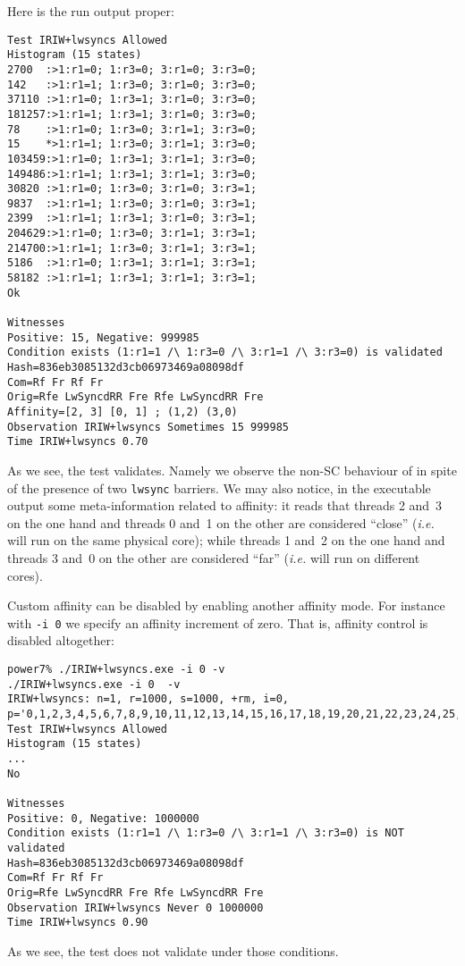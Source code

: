 Here is the run output proper:
\begin{verbatim}
Test IRIW+lwsyncs Allowed
Histogram (15 states)
2700  :>1:r1=0; 1:r3=0; 3:r1=0; 3:r3=0;
142   :>1:r1=1; 1:r3=0; 3:r1=0; 3:r3=0;
37110 :>1:r1=0; 1:r3=1; 3:r1=0; 3:r3=0;
181257:>1:r1=1; 1:r3=1; 3:r1=0; 3:r3=0;
78    :>1:r1=0; 1:r3=0; 3:r1=1; 3:r3=0;
15    *>1:r1=1; 1:r3=0; 3:r1=1; 3:r3=0;
103459:>1:r1=0; 1:r3=1; 3:r1=1; 3:r3=0;
149486:>1:r1=1; 1:r3=1; 3:r1=1; 3:r3=0;
30820 :>1:r1=0; 1:r3=0; 3:r1=0; 3:r3=1;
9837  :>1:r1=1; 1:r3=0; 3:r1=0; 3:r3=1;
2399  :>1:r1=1; 1:r3=1; 3:r1=0; 3:r3=1;
204629:>1:r1=0; 1:r3=0; 3:r1=1; 3:r3=1;
214700:>1:r1=1; 1:r3=0; 3:r1=1; 3:r3=1;
5186  :>1:r1=0; 1:r3=1; 3:r1=1; 3:r3=1;
58182 :>1:r1=1; 1:r3=1; 3:r1=1; 3:r3=1;
Ok

Witnesses
Positive: 15, Negative: 999985
Condition exists (1:r1=1 /\ 1:r3=0 /\ 3:r1=1 /\ 3:r3=0) is validated
Hash=836eb3085132d3cb06973469a08098df
Com=Rf Fr Rf Fr
Orig=Rfe LwSyncdRR Fre Rfe LwSyncdRR Fre
Affinity=[2, 3] [0, 1] ; (1,2) (3,0)
Observation IRIW+lwsyncs Sometimes 15 999985
Time IRIW+lwsyncs 0.70
\end{verbatim}
As we see, the test validates. Namely we observe the non-SC behaviour of
 in spite of the presence of two \texttt{lwsync} barriers.
We may also notice, in the executable output some meta-information related
to affinity: it reads that threads 2 and~3 on the one hand and threads 0
and~1 on the other are considered ``close'' (\emph{i.e.} will run on the
same physical core); while threads 1 and~2 on the one hand and threads 3 and~0
on the other are considered ``far'' (\emph{i.e.} will run on different cores).


Custom affinity can be disabled by enabling another affinity mode.
For instance with \texttt{-i 0} we specify an affinity increment of zero.
That is, affinity control is disabled altogether:
\begin{verbatim}
power7% ./IRIW+lwsyncs.exe -i 0 -v
./IRIW+lwsyncs.exe -i 0  -v
IRIW+lwsyncs: n=1, r=1000, s=1000, +rm, i=0, p='0,1,2,3,4,5,6,7,8,9,10,11,12,13,14,15,16,17,18,19,20,21,22,23,24,25,26,27,28,29,30,31'
Test IRIW+lwsyncs Allowed
Histogram (15 states)
...
No

Witnesses
Positive: 0, Negative: 1000000
Condition exists (1:r1=1 /\ 1:r3=0 /\ 3:r1=1 /\ 3:r3=0) is NOT validated
Hash=836eb3085132d3cb06973469a08098df
Com=Rf Fr Rf Fr
Orig=Rfe LwSyncdRR Fre Rfe LwSyncdRR Fre
Observation IRIW+lwsyncs Never 0 1000000
Time IRIW+lwsyncs 0.90
\end{verbatim}
As we see, the test does not validate under those conditions.

